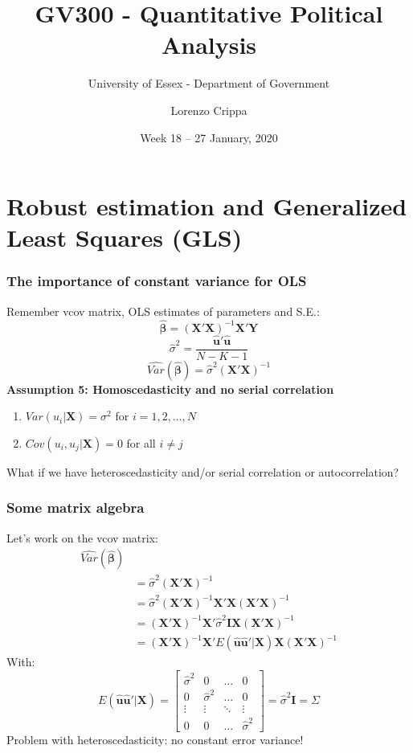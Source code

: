 \documentclass[xcolor=table,dvipsnames]{beamer}
\title{GV300 - Quantitative Political Analysis}
\subtitle{University of Essex - Department of Government}
\date{Week 18 -- 27 January, 2020}				%
\author{Lorenzo Crippa}
\begin{document}
\frame{
\titlepage
}


\section{Robust estimation and Generalized Least Squares (GLS)}

\begin{frame} 
\frametitle{The importance of constant variance for OLS}
Remember vcov matrix, OLS estimates of parameters and S.E.:
$$\mathbf{\hat{\beta}}= (\mathbf{X'}\mathbf{X})^{-1}\mathbf{X}'\mathbf{Y}$$
$$\hat{\sigma}^2=\frac{\mathbf{\hat{u}}'\mathbf{\hat{u}}}{N-K-1} $$ 
$$\widehat{Var}(\mathbf{\hat{\beta}}) = \hat{\sigma}^2(\mathbf{X'X})^{-1}$$ \pause
\textbf{Assumption 5: Homoscedasticity and no serial correlation}
\begin{enumerate}
\item $Var(u_i|\mathbf{X})=\sigma^2$ for $i=1,2,\ldots,N$ \pause
\item $Cov(u_i,u_j|\mathbf{X})=0$ for all $i\neq j$ \pause
\end{enumerate}
What if we have heteroscedasticity and/or serial correlation or autocorrelation? 
\end{frame}

\begin{frame}[fragile]
\frametitle{Some matrix algebra}
Let's work on the vcov matrix:
\begin{equation}
\begin{aligned}
\widehat{Var}(\mathbf{\hat{\beta}}) \\
& = \hat{\sigma}^2(\mathbf{X'X})^{-1} \\
& = \hat{\sigma}^2(\mathbf{X'X})^{-1} \mathbf{X}'\mathbf{X} (\mathbf{X}'\mathbf{X})^{-1} \\
& = (\mathbf{X'X})^{-1} \mathbf{X}'\hat{\sigma}^2 \mathbf{I}\mathbf{X} (\mathbf{X}'\mathbf{X})^{-1} \\
& = (\mathbf{X'X})^{-1} \mathbf{X}' E(\mathbf{\hat{u}}\mathbf{\hat{u}}'|\mathbf{X}) \mathbf{X} (\mathbf{X}'\mathbf{X})^{-1}
\end{aligned}
\end{equation} \pause
With:
$$E(\mathbf{\hat{u}}\mathbf{\hat{u}}'|\mathbf{X})=
\left[
\begin{array}{cccc}
\hat{\sigma}^2 & 0  		& \ldots & 0\\
0 		 & \hat{\sigma}^2 & \ldots & 0\\
\vdots 	 & \vdots 	& \ddots & \vdots\\
0 		 & 0		& \ldots & \hat{\sigma}^2 
\end{array}
\right] = \hat{\sigma}^2 \mathbf{I} = \Sigma
$$ \pause
Problem with heteroscedasticity: no constant error variance!
\end{frame}
\end{document}
